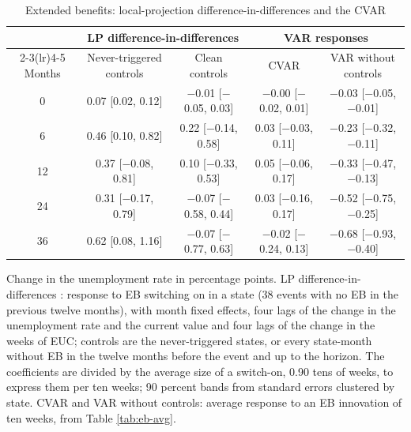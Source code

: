\begin{table}[htbp]
\centering
\caption{Extended benefits: local-projection difference-in-differences and the CVAR\label{tab:eb-lpdid}}
\small
\begin{tabular}{ccccc}
\toprule
 & \multicolumn{2}{c}{LP difference-in-differences} & \multicolumn{2}{c}{VAR responses} \\
\cmidrule(lr){2-3}\cmidrule(lr){4-5}
Months & Never-triggered controls & Clean controls & CVAR & VAR without controls \\
\midrule
0 & 0.07 [0.02, 0.12] & $-$0.01 [$-$0.05, 0.03] & $-$0.00 [$-$0.02, 0.01] & $-$0.03 [$-$0.05, $-$0.01] \\
6 & 0.46 [0.10, 0.82] & 0.22 [$-$0.14, 0.58] & 0.03 [$-$0.03, 0.11] & $-$0.23 [$-$0.32, $-$0.11] \\
12 & 0.37 [$-$0.08, 0.81] & 0.10 [$-$0.33, 0.53] & 0.05 [$-$0.06, 0.17] & $-$0.33 [$-$0.47, $-$0.13] \\
24 & 0.31 [$-$0.17, 0.79] & $-$0.07 [$-$0.58, 0.44] & 0.03 [$-$0.16, 0.17] & $-$0.52 [$-$0.75, $-$0.25] \\
36 & 0.62 [0.08, 1.16] & $-$0.07 [$-$0.77, 0.63] & $-$0.02 [$-$0.24, 0.13] & $-$0.68 [$-$0.93, $-$0.40] \\
\bottomrule
\end{tabular}
\par\smallskip\parbox{0.95\textwidth}{\footnotesize Change in the unemployment rate in percentage points. LP difference-in-differences \citep{dube2023local}: response to EB switching on in a state (38 events with no EB in the previous twelve months), with month fixed effects, four lags of the change in the unemployment rate and the current value and four lags of the change in the weeks of EUC; controls are the never-triggered states, or every state-month without EB in the twelve months before the event and up to the horizon. The coefficients are divided by the average size of a switch-on, 0.90 tens of weeks, to express them per ten weeks; 90 percent bands from standard errors clustered by state. CVAR and VAR without controls: average response to an EB innovation of ten weeks, from Table \ref{tab:eb-avg}.}
\end{table}
